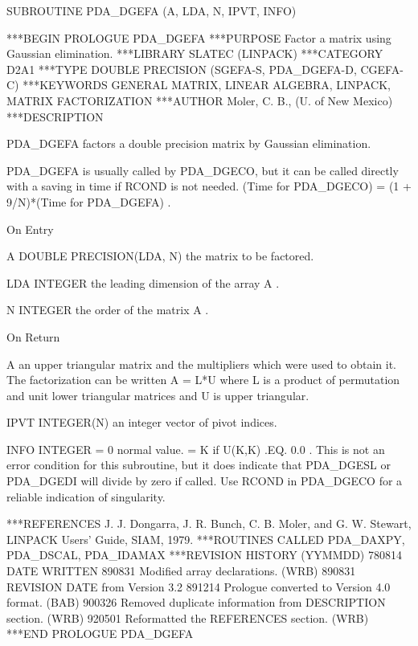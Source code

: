 \documentclass[11pt,twoside,nolof]{starlink}
\begin{document}
\begin{terminalv}
      SUBROUTINE PDA_DGEFA (A, LDA, N, IPVT, INFO)


***BEGIN PROLOGUE  PDA_DGEFA
***PURPOSE  Factor a matrix using Gaussian elimination.
***LIBRARY   SLATEC (LINPACK)
***CATEGORY  D2A1
***TYPE      DOUBLE PRECISION (SGEFA-S, PDA_DGEFA-D, CGEFA-C)
***KEYWORDS  GENERAL MATRIX, LINEAR ALGEBRA, LINPACK,
             MATRIX FACTORIZATION
***AUTHOR  Moler, C. B., (U. of New Mexico)
***DESCRIPTION

     PDA_DGEFA factors a double precision matrix by Gaussian elimination.

     PDA_DGEFA is usually called by PDA_DGECO, but it can be called
     directly with a saving in time if  RCOND  is not needed.
     (Time for PDA_DGECO) = (1 + 9/N)*(Time for PDA_DGEFA) .

     On Entry

        A       DOUBLE PRECISION(LDA, N)
                the matrix to be factored.

        LDA     INTEGER
                the leading dimension of the array  A .

        N       INTEGER
                the order of the matrix  A .

     On Return

        A       an upper triangular matrix and the multipliers
                which were used to obtain it.
                The factorization can be written  A = L*U  where
                L  is a product of permutation and unit lower
                triangular matrices and  U  is upper triangular.

        IPVT    INTEGER(N)
                an integer vector of pivot indices.

        INFO    INTEGER
                = 0  normal value.
                = K  if  U(K,K) .EQ. 0.0 .  This is not an error
                     condition for this subroutine, but it does
                     indicate that PDA_DGESL or PDA_DGEDI will divide by zero
                     if called.  Use  RCOND  in PDA_DGECO for a reliable
                     indication of singularity.

***REFERENCES  J. J. Dongarra, J. R. Bunch, C. B. Moler, and G. W.
                 Stewart, LINPACK Users' Guide, SIAM, 1979.
***ROUTINES CALLED  PDA_DAXPY, PDA_DSCAL, PDA_IDAMAX
***REVISION HISTORY  (YYMMDD)
   780814  DATE WRITTEN
   890831  Modified array declarations.  (WRB)
   890831  REVISION DATE from Version 3.2
   891214  Prologue converted to Version 4.0 format.  (BAB)
   900326  Removed duplicate information from DESCRIPTION section.
           (WRB)
   920501  Reformatted the REFERENCES section.  (WRB)
***END PROLOGUE  PDA_DGEFA
\end{terminalv}
\end{document}
